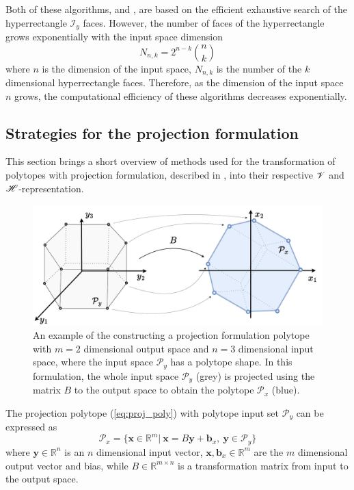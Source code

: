 Both of these algorithms, \citet{chiacchio_evaluation_1996} and \citet{sasaki2011vertex}, are based on the efficient exhaustive search of the hyperrectangle $\mathcal{I}_y$ faces. However, the number of faces of the hyperrectangle grows exponentially with the input space dimension
$$
N_{n,k}= 2^{n-k}\binom{n}{k}
$$
where $n$ is the dimension of the input space, $N_{n,k}$ is the number of the $k$ dimensional hyperrectangle faces. Therefore,  as the dimension of the input space $n$ grows, the computational efficiency of these algorithms decreases exponentially.

\subsection{Strategies for the projection formulation}
\label{ch:projection_algos}

This section brings a short overview of methods used for the transformation of polytopes with projection formulation, described in , into their respective $\mathscr{V}$ and $\mathscr{H}$-representation.

\label{ch:proj_poly_chapter}
\begin{figure}
    \centering
    \includegraphics[width=0.7\linewidth]{Chapters/imgs/proj_poly.pdf}
    \caption{An example of the constructing a projection formulation polytope with $m=2$ dimensional output space and $n=3$ dimensional input space, where the input space $\mathcal{P}_y$ has a polytope shape. In this formulation, the whole input space $\mathcal{P}_y$ (grey) is projected using the matrix $B$ to the output space to obtain the polytope $\mathcal{P}_x$ (blue). }
    \label{fig:proj_poly}
\end{figure}

The projection polytope (\ref{eq:proj_poly}) with polytope input set $\mathcal{P}_y$ can be expressed as
\begin{equation}
    \mathcal{P}_x=\{\bm{x}\in\mathbb{R}^m |~ \bm{x} = B\bm{y} + \bm{b}_x,~\bm{y} \in \mathcal{P}_y  \}
    \label{eq:proj_poly_1}
\end{equation}
where $\bm{y}\in\mathbb{R}^n$ is an $n$ dimensional input vector, $\bm{x},\bm{b}_x\in\mathbb{R}^m$ are the $m$ dimensional output vector and bias, while $B\in\mathbb{R}^{m\times n}$ is a transformation matrix from input to the output space.

